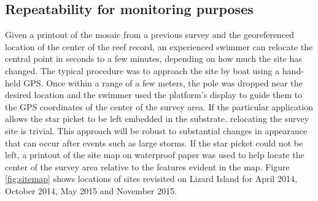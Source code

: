 
\subsection{Repeatability for monitoring purposes}
Given a printout of the mosaic from a previous survey and the georeferenced location of the center of the reef record, an experienced swimmer can relocate the central point in seconds to a few minutes, depending on how much the site has changed. The typical procedure was to approach the site by boat using a hand-held GPS.  Once within a range of a few meters, the pole was dropped near the desired location and the swimmer used the platform's display to guide them to the GPS coordinates of the center of the survey area.
If the particular application allows the star picket to be left embedded in the substrate, relocating the survey site is trivial. This approach will be robust to substantial changes in appearance that can occur after events such as large storms.  If the star picket could not be left, a printout of the site map on waterproof paper was used to help locate the center of the survey area relative to the features evident in the map.
Figure \ref{fig:sitemap} shows locations of sites revisited on Lizard Island for April 2014, October 2014, May 2015 and November 2015.

